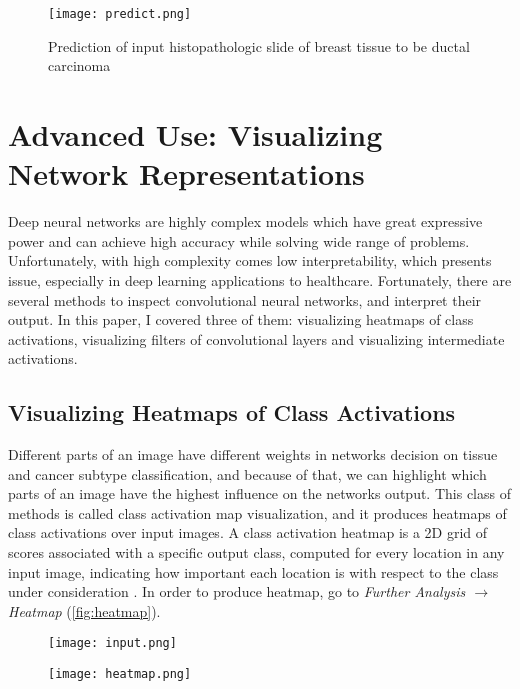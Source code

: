 \begin{figure}[h]
	\centering
	\texttt{[image: predict.png]}
	\caption{Prediction of input histopathologic slide of breast tissue to be ductal carcinoma}
	\label{fig:predict}
\end{figure}

\section{Advanced Use: Visualizing Network Representations}
\label{advuse}

Deep neural networks are highly complex models which have great expressive power and can achieve high accuracy while solving wide range of problems. Unfortunately, with high complexity comes low interpretability, which presents issue, especially in deep learning applications to healthcare. Fortunately, there are several methods to inspect convolutional neural networks, and interpret their output. In this paper, I covered three of them: visualizing heatmaps of class activations, visualizing filters of convolutional layers and visualizing intermediate activations.

\subsection{Visualizing Heatmaps of Class Activations}

Different parts of an image have different weights in networks decision on tissue and cancer subtype classification, and because of that, we can highlight which parts of an image have the highest influence on the networks output. This class of methods is called class activation map visualization, and it produces heatmaps of class activations over input images. A class activation heatmap is a 2D grid of scores associated with a specific output class, computed for every location in any input image, indicating how important each location is with respect to the class under consideration \cite{chollet2018deep}. In order to produce heatmap, go to \emph{Further Analysis $\rightarrow$ Heatmap} (\textcolor{red}{\autoref{fig:heatmap}}).

\begin{figure}[h]
	\centering
	\begin{minipage}{.5\textwidth}
		\centering
		\texttt{[image: input.png]}
		\label{fig:input}
	\end{minipage}%
	\begin{minipage}{.5\textwidth}
		\centering
		\texttt{[image: heatmap.png]}
		\label{fig:heatmap}
	\end{minipage}
\end{figure}

